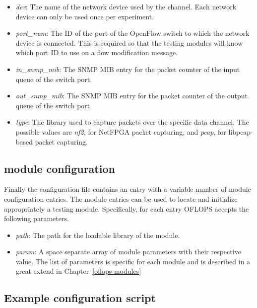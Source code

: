 \documentclass{book}
\begin{document}
          \begin{itemize}
          \item \emph{dev}: The name of the network device used by the channel. Each 
          network device can only be used once per experiment. 
          \item \emph{port\_num}: The ID of the port of the OpenFlow switch to which 
          the network device is connected. This is required so that the testing modules
          will know which port ID to use on a flow modification message. 
          \item \emph{in\_snmp\_mib}: The SNMP MIB entry for the packet counter of the 
          input queue of the switch port. 
          \item \emph{out\_snmp\_mib}: The SNMP MIB entry for the packet counter of the
          output queue of the switch port. 
          \item \emph{type}: The library used to capture packets over the specific data
          channel. The possible values are \emph{nf2}, for NetFPGA packet capturing, and 
          \emph{pcap}, for libpcap-based packet capturing. 
          \end{itemize}

          \subsection{module configuration}

          Finally the configuration file contains an entry with a variable number
          of module configuration entries. The module entries can be used to locate 
          and initialize appropriately a testing module. Specifically, for each entry
          OFLOPS accepts the following parameters. 

          \begin{itemize}
          \item \emph{path}: The path for the loadable library of the module. 
          \item \emph{param}: A space separate array of module parameters with their 
          respective value. The list of parameters is specific for each module and is 
          described in a great extend in Chapter~\ref{oflops-modules}
          \end{itemize}

          \subsection{Example configuration script}
\end{document}
